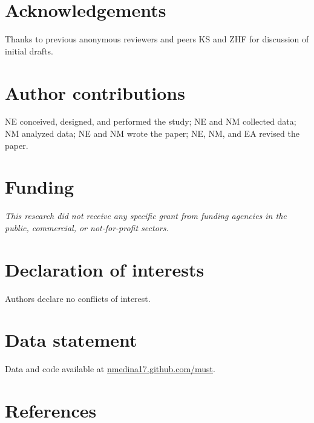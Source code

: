 \documentclass[
  12pt,
]{article}
\begin{document}
\hypertarget{acknowledgements}{%
\section{Acknowledgements}\label{acknowledgements}}

Thanks to previous anonymous reviewers and peers KS and ZHF for discussion of initial drafts.

\hypertarget{author-contributions}{%
\section{Author contributions}\label{author-contributions}}

NE conceived, designed, and performed the study; NE and NM collected data; NM analyzed data; NE and NM wrote the paper; NE, NM, and EA revised the paper.

\hypertarget{funding}{%
\section{Funding}\label{funding}}

\emph{This research did not receive any specific grant from funding agencies in the public, commercial, or not-for-profit sectors.}

\hypertarget{declaration-of-interests}{%
\section{Declaration of interests}\label{declaration-of-interests}}

Authors declare no conflicts of interest.

\hypertarget{data-statement}{%
\section{Data statement}\label{data-statement}}

Data and code available at \url{nmedina17.github.com/must}.

\newpage

\hypertarget{references}{%
\section*{References}\label{references}}
\end{document}
